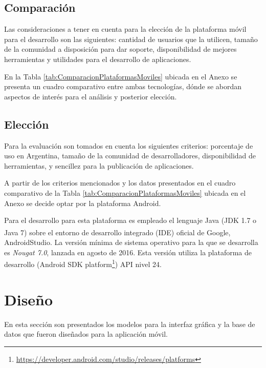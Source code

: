     \subsection{Comparación}
        \par Las consideraciones a tener en cuenta para la elección de la plataforma móvil para el desarrollo son las siguientes: cantidad de usuarios que la utilicen, tamaño de la comunidad a disposición para dar soporte, disponibilidad de mejores herramientas y utilidades para el desarrollo de aplicaciones.
        
        \par En la Tabla \ref{tab:ComparacionPlataformasMoviles} ubicada en el Anexo se presenta un cuadro comparativo entre ambas tecnologías, dónde se abordan aspectos de interés para el análisis y posterior elección.
        

    \subsection{Elección}
    
    \par
    Para la evaluación son tomados en cuenta los siguientes criterios: porcentaje de uso en Argentina, tamaño de la comunidad de desarrolladores, disponibilidad de herramientas, y sencillez para la publicación de aplicaciones.
    \par
    A partir de los criterios mencionados y los datos presentados en el cuadro comparativo de la Tabla \ref{tab:ComparacionPlataformasMoviles} ubicada en el Anexo se decide optar por la plataforma Android.
    
    \par Para el desarrollo para esta plataforma es empleado el lenguaje Java (JDK 1.7 o Java 7) sobre el entorno de desarrollo integrado (IDE) oficial de Google\textsuperscript{\textregistered}, AndroidStudio. La versión mínima de sistema operativo para la que se desarrolla es \textit{Nougat 7.0}, lanzada en agosto de 2016. Esta versión utiliza la plataforma de desarrollo (Android SDK platform\footnote{\url{https://developer.android.com/studio/releases/platforms}}) API nivel 24.

\section{Diseño}
    
    \par En esta sección son presentados los modelos para la interfaz gráfica y la base de datos que fueron diseñados para la aplicación móvil.
    
